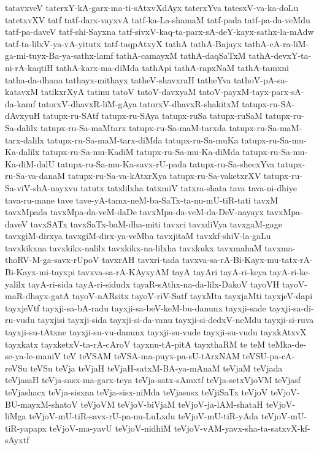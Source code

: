 {tatavxveV
taterxY-kA-garx-ma-ti-sAtxvXdAyx
taterxYva
tatesxV-va-ka-doLu
tatetxvXV
tatf
tatf-darx-vayxvA
tatf-ka-La-shamaM
tatf-pada
tatf-pa-da-veMdu
tatf-pa-daveV
tatf-shi-Sayxna
tatf-sivxV-kaq-ta-parx-sA-deY-kayx-sathx-la-mAdw
tatf-ta-lilxV-ya-vA-yitutx
tatf-taqpAtxyX
tathA
tathA-Bajayx
tathA-cA-ra-liM-ga-mi-tuyx-Ba-ya-sathx-lamf
tathA-camayxM
tathA-daqSaTxM
tathA-devxY-ta-ni-rA-kaqtiH
tathA-karx-ma-diMda
tathApi
tathA-rapxNaM
tathA-tamxni
tatha-da-dhana
tathayx-mithayx
tatheV-shavxraH
tatheYva
tathoV-pA-sa-katavxM
tatikxrXyA
tatinu
tatoV
tatoV-davxyaM
tatoV-payxM-tayx-parx-sA-da-kamf
tatorxV-dhavxR-liM-gAya
tatorxV-dhavxR-shakitxM
tatupx-ru-SA-dAvxyuH
tatupx-ru-SAtf
tatupx-ru-SAya
tatupx-ruSa
tatupx-ruSaM
tatupx-ru-Sa-dalilx
tatupx-ru-Sa-maMtarx
tatupx-ru-Sa-maM-tarxda
tatupx-ru-Sa-maM-tarx-dalilx
tatupx-ru-Sa-maM-tarx-diMda
tatupx-ru-Sa-muKa
tatupx-ru-Sa-mu-Ka-dalilx
tatupx-ru-Sa-mu-KadiM
tatupx-ru-Sa-mu-Ka-diMda
tatupx-ru-Sa-mu-Ka-diM-dalU
tatupx-ru-Sa-mu-Ka-savx-rU-pada
tatupx-ru-Sa-shecxYva
tatupx-ru-Sa-va-danaM
tatupx-ru-Sa-va-kAtxrXya
tatupx-ru-Sa-vaketxrXV
tatupx-ru-Sa-viV-shA-nayxvu
tatutx
tatxlilxha
tatxmiV
tatxra-shata
tava
tava-ni-dhiye
tava-ru-mane
tave
tave-yA-tamx-neM-ba-SaTx-ta-nu-mU-tiR-tati
tavxM
tavxMpada
tavxMpa-da-veM-daDe
tavxMpa-da-veM-da-DeV-nayayx
tavxMpa-daveV
tavxSATx
tavxSaTx-baM-dha-miti
tavxci
tavxdiVya
tavxgaM-gage
tavxgiM-dirxya
tavxgiM-dirx-ya-veMba
tavxjitaM
tavxkf-shiV-la-gaLu
tavxkikxna
tavxkikx-nalilx
tavxkikx-na-lilxha
tavxkukx
tavxmahaM
tavxma-thoRV-M-ga-savx-rUpoV
tavxrAH
tavxri-tada
tavxva-sa-rA-Bi-Kayx-mu-tatx-rA-Bi-Kayx-mi-tayxpi
tavxva-sa-rA-KAyxyAM
tayA
tayAri
tayA-ri-keya
tayA-ri-ke-yalilx
tayA-ri-sida
tayA-ri-sidudx
tayaR-sAthx-na-da-lilx-DakoV
tayoVH
tayoV-maR-dhayx-gatA
tayoV-nARsitx
tayoV-riV-Satf
tayxMta
tayxjaMti
tayxjeV-dapi
tayxjeVtf
tayxji-sa-bA-radu
tayxji-sa-beV-keM-bu-danunx
tayxji-sade
tayxji-sa-di-ru-vudu
tayxjisi
tayxji-sida
tayxji-si-da-vanu
tayxji-si-dedxV-neMdu
tayxji-si-ruva
tayxji-su-tAtxne
tayxji-su-vu-danunx
tayxji-su-vude
tayxji-su-vudu
tayxkAtxvX
tayxkatx
tayxketxV-ta-rA-cAroV
tayxnu-tA-pitA
tayxthaRM
te
teM
teMka-de-se-ya-le-maniV
teV
teVSAM
teVSA-ma-puyx-pa-sU-tArxNAM
teVSU-pa-cA-reVSu
teVSu
teVja
teVjaH
teVjaH-satxM-BA-ya-mAnaM
teVjaM
teVjada
teVjasaH
teVja-sasx-ma-garx-teya
teVja-satx-sAmxtf
teVja-setxVjoVM
teVjasf
teVjashacx
teVja-sisxna
teVja-sisx-niMda
teVjasusx
teVjiSaTx
teVjoV
teVjoV-BU-mayxM-shatoV
teVjoVM
teVjoV-biVjaM
teVjoV-ja-lAM-shataH
teVjoV-liMga
teVjoV-mU-tiR-savx-rU-pa-nu-LuLxdu
teVjoV-mU-tiR-yAda
teVjoV-mU-tiR-yapapx
teVjoV-ma-yavU
teVjoV-nidhiM
teVjoV-vAM-yavx-sha-ta-satxvX-kf-sAyxtf
}
